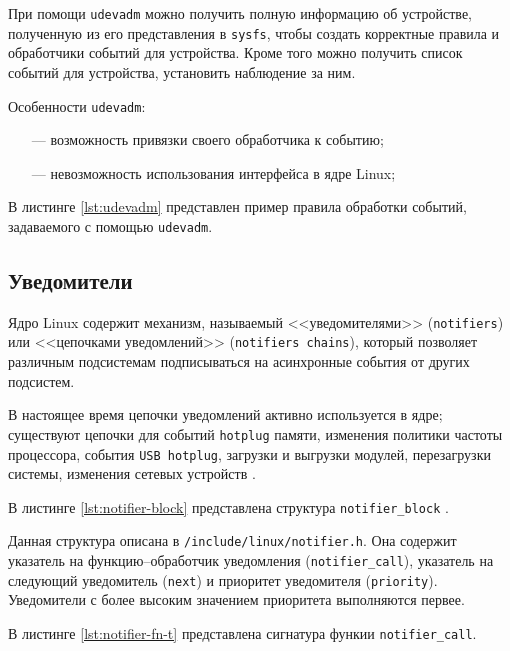При помощи \texttt{udevadm} можно получить полную информацию об устройстве, полученную из его представления в \texttt{sysfs}, чтобы создать корректные правила и обработчики событий для устройства. Кроме того можно получить список событий для устройства, установить наблюдение за ним.

Особенности \texttt{udevadm}:

\begin{itemize}
	\item[---] возможность привязки своего обработчика к событию;
	\item[---] невозможность использования интерфейса в ядре Linux;
\end{itemize}


В листинге \ref{lst:udevadm} представлен пример правила обработки событий, задаваемого с помощью \texttt{udevadm}.


\subsection{Уведомители}

Ядро Linux содержит механизм, называемый <<уведомителями>> (\texttt{notifiers}) или <<цепочками уведомлений>> (\texttt{notifiers chains}), который позволяет различным подсистемам подписываться на асинхронные события от других подсистем. 

В настоящее время цепочки уведомлений активно используется в ядре; существуют цепочки для событий \texttt{hotplug} памяти, изменения политики частоты процессора, события \texttt{USB hotplug}, загрузки и выгрузки модулей, перезагрузки системы, изменения сетевых устройств \cite{notifications}.

В листинге \ref{lst:notifier-block} представлена структура \texttt{notifier\_block} \cite{notifierblock}.


Данная структура описана в \texttt{/include/linux/notifier.h}. Она содержит указатель на функцию--обработчик уведомления (\texttt{notifier\_call}), указатель на следующий уведомитель (\texttt{next}) и приоритет уведомителя (\texttt{priority}). Уведомители с более высоким значением приоритета выполняются первее.

В листинге \ref{lst:notifier-fn-t} представлена сигнатура функии \texttt{notifier\_call}.

